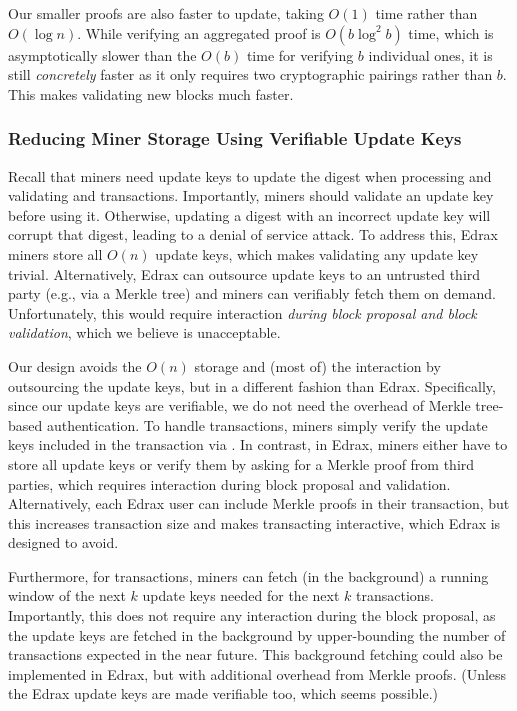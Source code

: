 Our smaller proofs are also faster to update, taking $O(1)$ time rather than $O(\log{n})$.
While verifying an aggregated proof is $O(b\log^2{b})$ time, which is asymptotically slower than the $O(b)$ time for verifying $b$ individual ones, it is still \textit{concretely} faster as it only requires two cryptographic pairings rather than $b$.
This makes validating new blocks much faster.

\subsubsection{Reducing Miner Storage Using Verifiable Update Keys}
\label{s:stateless-cryptocurrency:dos-update-key}

Recall that miners need update keys to update the digest when processing and validating \inittxn and \spendtxn transactions.
Importantly, miners should validate an update key before using it.
Otherwise, updating a digest with an incorrect update key will corrupt that digest, leading to a denial of service attack.
To address this, Edrax miners store all $O(n)$ update keys, which makes validating any update key trivial.
Alternatively, Edrax can outsource update keys to an untrusted third party (e.g., via a Merkle tree) and miners can verifiably fetch them on demand.
Unfortunately, this would require interaction \textit{during block proposal and block validation}, which we believe is unacceptable.

Our design avoids the $O(n)$ storage and (most of) the interaction by outsourcing the update keys, but in a different fashion than Edrax.
Specifically, since our update keys are verifiable, we do not need the overhead of Merkle tree-based authentication.
To handle \spendtxn transactions, miners simply verify the update keys included in the transaction via \vcverifyupk.
In contrast, in Edrax, miners either have to store all update keys or verify them by asking for a Merkle proof from third parties, which requires interaction during block proposal and validation.
Alternatively, each Edrax user can include Merkle proofs in their transaction, but this increases transaction size and makes transacting interactive, which Edrax is designed to avoid.

Furthermore, for \inittxn transactions, miners can fetch (in the background) a running window of the next $k$ update keys needed for the next $k$ \inittxn transactions.
Importantly, this does not require any interaction during the block proposal, as the update keys are fetched in the background by upper-bounding the number of \inittxn transactions expected in the near future.
This background fetching could also be implemented in Edrax, but with additional overhead from Merkle proofs.
(Unless the Edrax update keys are made verifiable too, which seems possible.)

